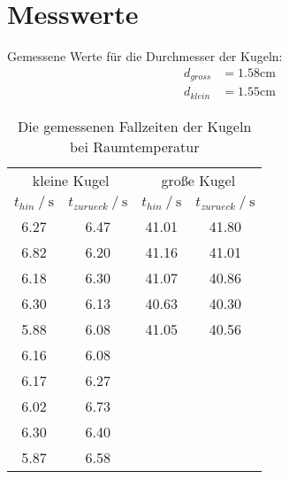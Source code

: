 \section{Messwerte}
\label{sec:Messwerte}

Gemessene Werte für die Durchmesser der Kugeln:
\begin{align*}
    d_{gross} &= 1.58\unit{\centi\meter}\\
    d_{klein} &= 1.55\unit{\centi\meter}
\end{align*}

\begin{table}
    \centering
    \caption{Die gemessenen Fallzeiten der Kugeln bei Raumtemperatur}
    \begin{tabular}{cccc}
      \toprule
      \multicolumn{2}{c}{kleine Kugel} & \multicolumn{2}{c}{große Kugel} \\
      \cmidrule(lr){1-2} \cmidrule(lr){3-4}
      {$t_{hin} \mathbin{/} \unit{\second}$} &
      {$t_{zurueck} \mathbin{/} \unit{\second}$} &
      {$t_{hin} \mathbin{/} \unit{\second}$} &
      {$t_{zurueck} \mathbin{/} \unit{\second}$} \\
      \midrule
        6.27 & 6.47 & 41.01 & 41.80 \\
        6.82 & 6.20 & 41.16 & 41.01 \\
        6.18 & 6.30 & 41.07 & 40.86 \\
        6.30 & 6.13 & 40.63 & 40.30 \\
        5.88 & 6.08 & 41.05 & 40.56 \\
        6.16 & 6.08 \\
        6.17 & 6.27 \\
        6.02 & 6.73 \\
        6.30 & 6.40 \\
        5.87 & 6.58 \\
      \bottomrule
    \end{tabular}
    \label{tab:Tabelle1}
\end{table}

